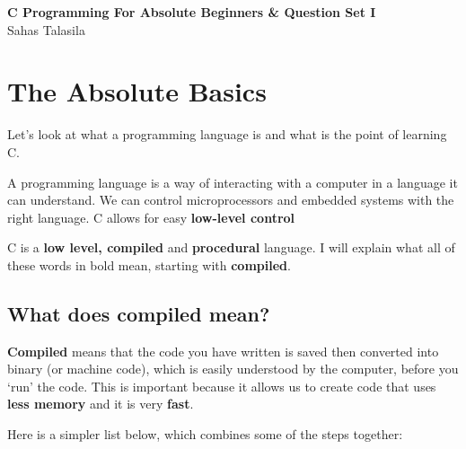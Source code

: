 \documentclass[a4paper,12pt]{article}
\begin{document}
\pagestyle{empty} 

\begin{titlepage}
    \centering
    \vspace*{2cm}
    \Huge{\textbf{C Programming For Absolute Beginners \& Question Set I}} \\[1.5cm]
    \Large{Sahas Talasila} \\[1cm]
    \vfill
    \vfill
\end{titlepage}

\tableofcontents
\newpage

\section{The Absolute Basics}

Let's look at what a programming language is and what is the point of learning C.

A programming language is a way of interacting with a computer in a language it can understand. We can control microprocessors and embedded systems with the right language. C allows for easy \textbf{low-level control} 

C is a \textbf{low level, compiled} and \textbf{procedural} language. I will explain what all of these words in bold mean, starting with \textbf{compiled}.

\subsection{What does compiled mean?}

\textbf{Compiled} means that the code you have written is saved then converted into binary (or machine code), which is easily understood by the computer, before you `run' the code. This is important because it allows us to create code that uses \textbf{less memory} and it is very \textbf{fast}.

Here is a simpler list below, which combines some of the steps together:
\end{document}
